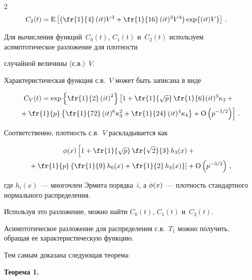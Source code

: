 \begin{multicols}{2}
\begin{align*}
C_2 (t) &= \E\left[ \left(\fr{1}{4}\,(it)V^3 + \fr{1}{16}\,(it)^2 V^4 \right) \exp\{(it)V \}\right]\,.

\end{align*}

Для вычисления функций~$C_0(t)$, $C_1(t)$ и~$C_2(t)$ используем асимптотическое разложение для плот\-ности 

случайной величины (с.в.)~$V$.

Характеристическая функция с.в.~$V$ может быть записана в виде

\begin{multline*}

C_V(t) = \exp\left\{\fr{1}{2}\left(it\right)^2\right\}

            \left[1 + \fr{1}{\sqrt{p}}\,\fr{1}{6}(it)^3\kappa_3 +{}\right.\\

\left.{}  + \fr{1}{p}\left\{\fr{1}{72}\,(it)^6\kappa_3^2 + \fr{1}{24}\,(it)^4\kappa_4 \right\} + \O\left(p^{-3/2}\right)\right]\,.

\end{multline*}

Соответственно, плотность с.в.~$V$ раскладывается как

\begin{multline*}

\Ip(x)\left[1 + \fr{1}{\sqrt p}\,\fr{\sqrt{2}}{3}\,h_3(x)

                  + {}\right.\\

\left.                  {}+\fr{1}{p}\left\{\fr{1}{9}\,h_6(x) + \fr{1}{2}\,h_4(x) \right\}\right]+ \O\left(p^{-3/2}\right)\,,

\end{multline*}

где  $h_i(x)$~--- многочлен Эрмита порядка~$i$, а $\mbox{$\phi$}(x)$~--- плотность стандартного нормального распределения.

Используя это разложение,   можно  найти $C_0(t)$, $C_1(t)$ и~$C_2(t)$.

Асимптотическое разложение для распределения с.в.~$T_1$ можно получить, обращая ее характеристическую функцию. 

Тем самым доказана следующая теорема:



\medskip



\noindent

\textbf{Теорема 1.} %


\end{multicols}
